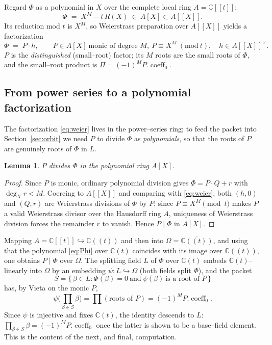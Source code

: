 \documentclass[11pt,reqno]{amsart}
\theoremstyle{plain}
\newtheorem{lemma}[theorem]{Lemma}
\theoremstyle{definition}
\newcommand{\C}{\mathbb{C}}
\begin{document}
Regard $\Phi$ as a polynomial in $X$ over the complete local ring $A=\C[\![t]\!]$:
\[
  \Phi \;=\; X^{M}-t\,R(X)\ \in\ A[X]\subset A[\![X]\!].
\]
Its reduction mod $t$ is $X^{M}$, so Weierstrass preparation over $A[\![X]\!]$ yields a factorization
\begin{equation}\label{eq:weier}
  \Phi \;=\; P\cdot h,\qquad P\in A[X]\ \text{monic of degree }M,\ P\equiv X^{M}\ (\mathrm{mod}\ t),\quad
  h\in A[\![X]\!]^{\times}.
\end{equation}
$P$ is the \emph{distinguished} (small--root) factor; its $M$ roots are the small roots of $\Phi$, and
the small--root product is $\Pi=(-1)^{M}P.\!\operatorname{coeff}_0$.

\subsection{From power series to a polynomial factorization}
The factorization \eqref{eq:weier} lives in the power--series ring; to feed the packet into
Section~\ref{sec:orbit} we need $P$ to divide $\Phi$ as \emph{polynomials}, so that the roots of $P$ are
genuinely roots of $\Phi$ in $L$.

\begin{lemma}\label{lem:dvd}
$P$ divides $\Phi$ in the polynomial ring $A[X]$.
\end{lemma}

\begin{proof}
Since $P$ is monic, ordinary polynomial division gives $\Phi=P\cdot Q+r$ with $\deg_X r<M$. Coercing to
$A[\![X]\!]$ and comparing with \eqref{eq:weier}, both $(h,0)$ and $(Q,r)$ are Weierstrass divisions of
$\Phi$ by $P$; since $P\equiv X^M\pmod t$ makes $P$ a valid Weierstrass divisor over the Hausdorff ring
$A$, uniqueness of Weierstrass division forces the remainder $r$ to vanish. Hence $P\mid\Phi$ in $A[X]$.
\end{proof}

Mapping $A=\C[\![t]\!]\hookrightarrow\C(\!(t)\!)$ and then into $\Omega=\overline{\C(\!(t)\!)}$, and using
that the polynomial \eqref{eq:Phi} over $\C(t)$ coincides with its image over $\C(\!(t)\!)$, one obtains
$P\mid\Phi$ over $\Omega$. The splitting field $L$ of $\Phi$ over $\C(t)$ embeds $\C(t)$--linearly into
$\Omega$ by an embedding $\psi\colon L\hookrightarrow\Omega$ (both fields split $\Phi$), and the packet
\[
  S=\{\,\beta\in L: \Phi(\beta)=0\ \text{and}\ \psi(\beta)\ \text{is a root of }P\,\}
\]
has, by Vieta on the monic $P$,
\[
  \psi\Big(\prod_{\beta\in S}\beta\Big)=\prod(\text{roots of }P)=(-1)^{M}P.\!\operatorname{coeff}_0 .
\]
Since $\psi$ is injective and fixes $\C(t)$, the identity descends to $L$: $\prod_{\beta\in
S}\beta=(-1)^{M}P.\!\operatorname{coeff}_0$ once the latter is shown to be a base--field element. This is
the content of the next, and final, computation.
\end{document}
